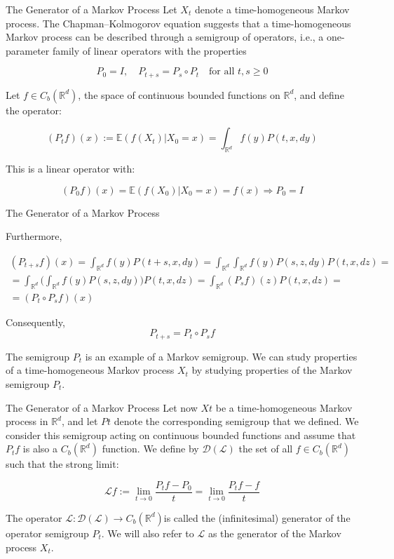 \documentclass{beamer}%
\theoremstyle{definition}
\newcommand{\R}{\mathbb{R}}
\newcommand{\E}{\mathbb{E}}
\begin{document}
\begin{frame}{The Generator of a Markov Process}
Let $X_t$ denote a time-homogeneous Markov process. The Chapman–Kolmogorov
equation suggests that a time-homogeneous Markov process can be described
through a semigroup of operators, i.e., a one-parameter family of linear operators
with the properties

\[P_0 = I, \quad P_{t+s} = P_s \circ P_{t} \quad \text{for all $t, s \geq 0$}\]

Let $f \in C_{b}(\R^d)$, the space of continuous bounded functions on $\R^d$, and define
the operator:

\[(P_t f)(x) := \E(f(X_t)|X_0 = x) = \int_{\R^d} f(y)P(t,x,dy)\]

This is a linear operator with:

\[(P_0 f)(x) = \E(f(X_0)|X_0 = x) = f(x) \Rightarrow P_0 = I\]
\end{frame}

\begin{frame}{The Generator of a Markov Process}

Furthermore,

\begin{gather*}
(P_{t+s}f)(x) = \int_{\R^d} f(y) P(t+s, x, dy) = \int_{\R^d} \int_{\R^d} f(y) P(s, z, dy) P(t, x, dz) = \\ = \int_{\R^d} \Big(\int_{\R^d} f(y) P(s, z, dy) \Big)P(t, x, dz) = \int_{\R^d} (P_s f)(z) P(t, x, dz) = \\ = (P_t \circ P_s f)(x)
\end{gather*}


Consequently, 
\[P_{t+s} = P_t \circ P_s f\]

The semigroup $P_t$ is an example of a Markov semigroup. We can
study properties of a time-homogeneous Markov process $X_t$ by studying properties
of the Markov semigroup $P_t$.
    
\end{frame}

\begin{frame}{The Generator of a Markov Process}
Let now $Xt$ be a time-homogeneous Markov process in $\R^d$, and let $Pt$ denote the
corresponding semigroup that we defined. We consider this semigroup acting on
continuous bounded functions and assume that $P_tf$ is also a $C_b(\R^d)$ function. We
define by $\mathscr{D}(\mathscr{L} )$ the set of all $f \in C_b(\R^d)$ such that the strong limit:

\[\mathscr{L} f := \lim_{t \to 0} \frac{P_t f - P_0}{t} = \lim_{t \to 0} \frac{P_t f - f}{t}\]

The operator $\mathscr{L} : \mathscr{D}(\mathscr{L}) \to C_b(\R^d)$is called the (infinitesimal) generator of
the operator semigroup $P_t$. We will also refer to $\mathscr{L}$ as the generator of the Markov
process $X_t$.
\end{frame}
\end{document}
